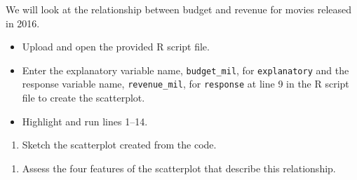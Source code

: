 \documentclass[
]{report}
\newenvironment{Shaded}{\begin{snugshade}}{\end{snugshade}}
\newcommand{\AttributeTok}[1]{\textcolor[rgb]{0.13,0.29,0.53}{#1}}
\newcommand{\CommentTok}[1]{\textcolor[rgb]{0.56,0.35,0.01}{\textit{#1}}}
\newcommand{\ConstantTok}[1]{\textcolor[rgb]{0.56,0.35,0.01}{#1}}
\newcommand{\FunctionTok}[1]{\textcolor[rgb]{0.13,0.29,0.53}{\textbf{#1}}}
\newcommand{\NormalTok}[1]{#1}
\newcommand{\SpecialCharTok}[1]{\textcolor[rgb]{0.81,0.36,0.00}{\textbf{#1}}}
\newcommand{\StringTok}[1]{\textcolor[rgb]{0.31,0.60,0.02}{#1}}
\providecommand{\tightlist}{%
  \setlength{\itemsep}{0pt}\setlength{\parskip}{0pt}}
\begin{document}
We will look at the relationship between budget and revenue for movies released in 2016.

\begin{itemize}
\item
  Upload and open the provided R script file.
\item
  Enter the explanatory variable name, \texttt{budget\_mil}, for \texttt{explanatory} and the response variable name, \texttt{revenue\_mil}, for \texttt{response} at line 9 in the R script file to create the scatterplot.
\item
  Highlight and run lines 1--14.
\end{itemize}

\begin{Shaded}
\end{Shaded}

\begin{enumerate}
\def\labelenumi{\arabic{enumi}.}
\tightlist
\item
  Sketch the scatterplot created from the code.
\end{enumerate}

\vspace{1.75in}

\begin{enumerate}
\def\labelenumi{\arabic{enumi}.}
\setcounter{enumi}{1}
\tightlist
\item
  Assess the four features of the scatterplot that describe this relationship.
\end{enumerate}
\end{document}
